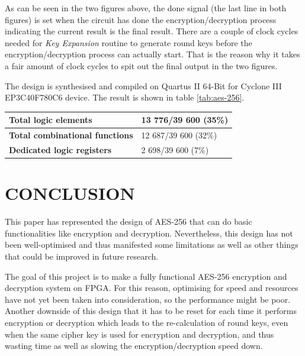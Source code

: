 \documentclass[a4paper, 10pt]{article}
\begin{document}
\begin{multicols}{2}
	As can be seen in the two figures above, the done signal (the last line in both figures) is set when the circuit has done the encryption/decryption process indicating the current result is the final result. There are a couple of clock cycles needed for \textit{Key Expansion} routine to generate round keys before the encryption/decryption process can actually start. That is the reason why it takes a fair amount of clock cycles to spit out the final output in the two figures.

	The design is synthesised and compiled on Quartus II 64-Bit for Cyclone III EP3C40F780C6 device. The result is shown in table \ref{tab:aes-256}.

        \noindent
	\begin{center}
		\label{tab:aes-256}
                    \begin{tabular}{| m{5.5cm} | m{3cm} |}
		\hline   
		\textbf{Total logic elements} & 13 776/39 600 (35\%)\\
                        \hline
                        \textbf{Total combinational functions} & 12 687/39 600 (32\%)\\
                        \hline
                        \textbf{Dedicated logic registers} & 2 698/39 600 (7\%)\\
                        \hline
                    \end{tabular}
	\end{center}

        \section{CONCLUSION}

        This paper has represented the design of AES-256 that can do basic functionalities like encryption and decryption. Nevertheless, this design has not been well-optimised and thus manifested some limitations as well as other things that could be improved in future research.

	The goal of this project is to make a fully functional AES-256 encryption and decryption system on FPGA. For this reason, optimising for speed and resources have not yet been taken into consideration, so the performance might be poor. Another downside of this design that it has to be reset for each time it performs encryption or decryption which leads to the re-calculation of round keys, even when the same cipher key is used for encryption and decryption, and thus wasting time as well as slowing the encryption/decryption speed down.


\end{multicols}
\end{document}
